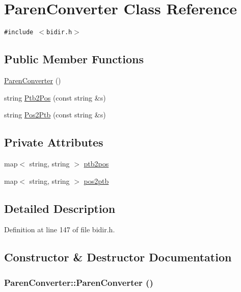\hypertarget{classParenConverter}{
\section{ParenConverter Class Reference}
\label{classParenConverter}
}
{\tt \#include $<$bidir.h$>$}

\subsection*{Public Member Functions}
\begin{CompactItemize}
\item 
\hyperlink{classParenConverter_51d83ee21cbc81a53f4798628dffb6b4}{ParenConverter} ()
\item 
string \hyperlink{classParenConverter_0f242c97403167a9113ab8e9e45270d7}{Ptb2Pos} (const string \&s)
\item 
string \hyperlink{classParenConverter_72070e57f3b3b547be3044aaa6ac1470}{Pos2Ptb} (const string \&s)
\end{CompactItemize}
\subsection*{Private Attributes}
\begin{CompactItemize}
\item 
map$<$ string, string $>$ \hyperlink{classParenConverter_7b670a720f3c2f0c72fdd04359140bcd}{ptb2pos}
\item 
map$<$ string, string $>$ \hyperlink{classParenConverter_d5a82ab3190aec6ad1b2249e68283195}{pos2ptb}
\end{CompactItemize}


\subsection{Detailed Description}


Definition at line 147 of file bidir.h.

\subsection{Constructor \& Destructor Documentation}
\hypertarget{classParenConverter_51d83ee21cbc81a53f4798628dffb6b4}{
\subsubsection[{ParenConverter}]{\setlength{\rightskip}{0pt plus 5cm}ParenConverter::ParenConverter ()}}
\label{classParenConverter_51d83ee21cbc81a53f4798628dffb6b4}




